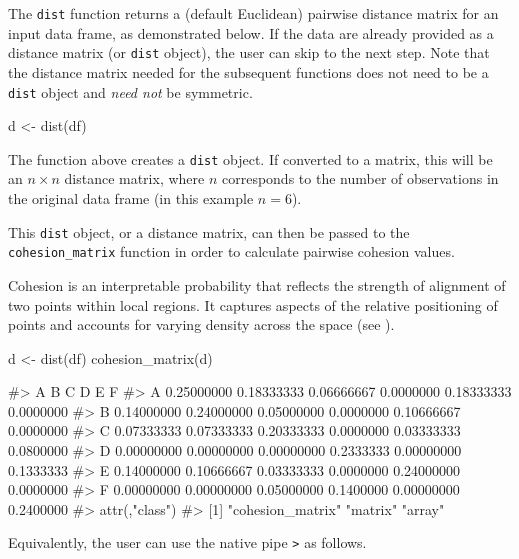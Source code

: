 The \texttt{dist} function returns a (default Euclidean) pairwise
distance matrix for an input data frame, as demonstrated below. If the
data are already provided as a distance matrix (or \texttt{dist}
object), the user can skip to the next step. Note that the distance
matrix needed for the subsequent functions does not need to be a
\texttt{dist} object and \emph{need not} be symmetric.

\begin{Schunk}
\begin{Sinput}
d <- dist(df)
\end{Sinput}
\end{Schunk}

The function above creates a \texttt{dist} object. If converted to a
matrix, this will be an \(n\times n\) distance matrix, where \(n\)
corresponds to the number of observations in the original data frame (in
this example \(n = 6\)).

This \texttt{dist} object, or a distance matrix, can then be passed to
the \texttt{cohesion\_matrix} function in order to calculate pairwise
cohesion values.

Cohesion is an interpretable probability that reflects the strength of
alignment of two points within local regions. It captures aspects of the
relative positioning of points and accounts for varying density across
the space (see \citet{berenhaut2022social}).

\begin{Schunk}
\begin{Sinput}
d <- dist(df)
cohesion_matrix(d)
\end{Sinput}
\begin{Soutput}
#>            A          B          C         D          E         F
#> A 0.25000000 0.18333333 0.06666667 0.0000000 0.18333333 0.0000000
#> B 0.14000000 0.24000000 0.05000000 0.0000000 0.10666667 0.0000000
#> C 0.07333333 0.07333333 0.20333333 0.0000000 0.03333333 0.0800000
#> D 0.00000000 0.00000000 0.00000000 0.2333333 0.00000000 0.1333333
#> E 0.14000000 0.10666667 0.03333333 0.0000000 0.24000000 0.0000000
#> F 0.00000000 0.00000000 0.05000000 0.1400000 0.00000000 0.2400000
#> attr(,"class")
#> [1] "cohesion_matrix" "matrix"          "array"
\end{Soutput}
\end{Schunk}

Equivalently, the user can use the native pipe
\texttt{\textbar{}\textgreater{}} as follows.

